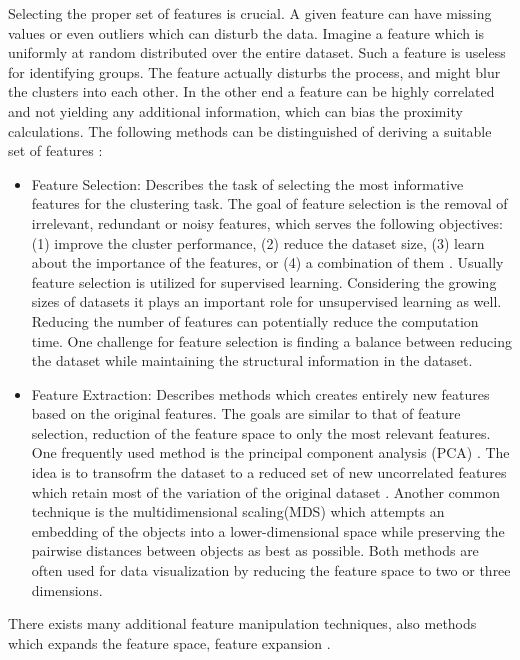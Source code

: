 \documentclass[a4paper,10pt]{article}
\theoremstyle{plain}
\theoremstyle{definition}
\begin{document}
Selecting the proper set of features is crucial. A given feature can have missing values or even outliers which can disturb the data. Imagine a feature which is uniformly at random distributed over the entire dataset. Such a feature is useless for identifying groups. The feature actually disturbs the process, and might blur the clusters into each other. In the other end a feature can be highly correlated and not yielding any additional information, which can bias the proximity calculations. The following methods can be distinguished of deriving a suitable set of features \cite{clusteringOverview}:
\begin{itemize}
	\item Feature Selection: Describes the task of selecting the most informative features for the clustering task. The goal of feature selection is the removal of irrelevant, redundant or noisy features, which serves the following objectives: (1) improve the cluster performance, (2) reduce the dataset size, (3) learn about the importance of the features, or (4) a combination of them \cite{22overview}. Usually feature selection is utilized for supervised learning. Considering the growing sizes of datasets it plays an important role for unsupervised learning as well. Reducing the number of features can potentially reduce the computation time. One challenge for feature selection is finding a balance between reducing the dataset while maintaining the structural information in the dataset.
	\item Feature Extraction: Describes methods which creates entirely new features based on the original features. The goals are similar to that of feature selection, reduction of the feature space to only the most relevant features. One frequently used method is the principal component analysis (PCA) \cite{26overview}. The idea is to transofrm the dataset to a reduced set of new uncorrelated features which retain most of the variation of the original dataset \cite{26overview}. Another common technique is the multidimensional scaling(MDS) which attempts an embedding of the objects into a lower-dimensional space while preserving the pairwise distances between objects as best as possible. Both methods are often used for data visualization by reducing the feature space to two or three dimensions.
\end{itemize}
There exists many additional feature manipulation techniques, also methods which expands the feature space, feature expansion \cite{33overview}.
\end{document}
